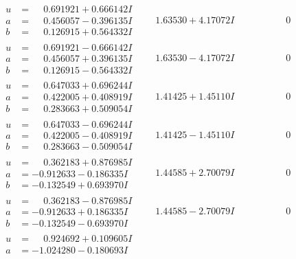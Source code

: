 \documentclass[1p]{elsarticle_modified}
\theoremstyle{definition}
\begin{document}
$$\begin{array}{c|c|c}
\begin{aligned}
u &= \phantom{-}0.691921 + 0.666142 I \\
a &= \phantom{-}0.456057 - 0.396135 I \\
b &= \phantom{-}0.126915 + 0.564332 I\end{aligned}
 & \phantom{-}1.63530 + 4.17072 I & \phantom{-0.000000 } 0 \\ \hline\begin{aligned}
u &= \phantom{-}0.691921 - 0.666142 I \\
a &= \phantom{-}0.456057 + 0.396135 I \\
b &= \phantom{-}0.126915 - 0.564332 I\end{aligned}
 & \phantom{-}1.63530 - 4.17072 I & \phantom{-0.000000 } 0 \\ \hline\begin{aligned}
u &= \phantom{-}0.647033 + 0.696244 I \\
a &= \phantom{-}0.422005 + 0.408919 I \\
b &= \phantom{-}0.283663 + 0.509054 I\end{aligned}
 & \phantom{-}1.41425 + 1.45110 I & \phantom{-0.000000 } 0 \\ \hline\begin{aligned}
u &= \phantom{-}0.647033 - 0.696244 I \\
a &= \phantom{-}0.422005 - 0.408919 I \\
b &= \phantom{-}0.283663 - 0.509054 I\end{aligned}
 & \phantom{-}1.41425 - 1.45110 I & \phantom{-0.000000 } 0 \\ \hline\begin{aligned}
u &= \phantom{-}0.362183 + 0.876985 I \\
a &= -0.912633 - 0.186335 I \\
b &= -0.132549 + 0.693970 I\end{aligned}
 & \phantom{-}1.44585 + 2.70079 I & \phantom{-0.000000 } 0 \\ \hline\begin{aligned}
u &= \phantom{-}0.362183 - 0.876985 I \\
a &= -0.912633 + 0.186335 I \\
b &= -0.132549 - 0.693970 I\end{aligned}
 & \phantom{-}1.44585 - 2.70079 I & \phantom{-0.000000 } 0 \\ \hline\begin{aligned}
u &= \phantom{-}0.924692 + 0.109605 I \\
a &= -1.024280 - 0.180693 I \\

\end{aligned}
\end{array}$$
\end{document}

